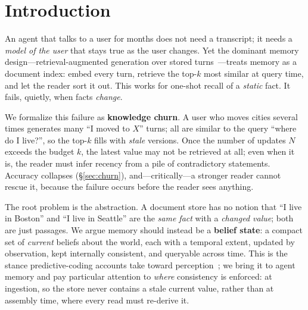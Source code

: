 \documentclass[11pt]{article}
\newcommand{\tenet}{\textsc{Tenet}}
\newcommand{\ci}[2]{{\footnotesize[#1,\,#2]}}
\begin{document}
\begin{abstract}
to HippoRAG-v2 ($65.1$) among published systems while being the only one whose ingestion
never calls an LLM, and beats every published memory framework on EventQA ($70.7$ vs $67.6$; Wilson CI excludes);
on MemoryAgentBench \textsc{Test-Time Learning} it pools $77.2$ \ci{73.3}{80.7}
($n{=}500$), above BM25 ($75.4$) and every published memory system (Zep $62.8$,
Mem0 $32.4$) on a weaker, zero-cost local 7B reader.
Run head-to-head against a released memory framework as a black box (ReMe, its own
ingest-and-retrieve pipeline end-to-end, identical reader and judge), \tenet{} scores
$67.0\%$ vs ReMe's $34.0\%$ on LongMemEval\_S ($n{=}100$, $p\approx2\times10^{-6}$).
All numbers are reproducible from released code with official metrics and prompts verbatim.
\end{abstract}

\section{Introduction}
An agent that talks to a user for months does not need a transcript; it needs a
\emph{model of the user} that stays true as the user changes. Yet the dominant memory
design---retrieval-augmented generation over stored turns~\cite{mem0,longmemeval}---treats
memory as a document index: embed every turn, retrieve the top-$k$ most similar at query
time, and let the reader sort it out. This works for one-shot recall of a \emph{static}
fact. It fails, quietly, when facts \emph{change}.

We formalize this failure as \textbf{knowledge churn}. A user who moves cities several
times generates many ``I moved to $X$'' turns; all are similar to the query ``where do I
live?'', so the top-$k$ fills with \emph{stale} versions. Once the number of updates $N$
exceeds the budget $k$, the latest value may not be retrieved at all; even when it is, the
reader must infer recency from a pile of contradictory statements. Accuracy collapses
(\S\ref{sec:churn}), and---critically---a stronger reader cannot rescue it, because the
failure occurs before the reader sees anything.

The root problem is the abstraction. A document store has no notion that ``I live in
Boston'' and ``I live in Seattle'' are the \emph{same fact} with a \emph{changed value};
both are just passages. We argue memory should instead be a \textbf{belief state}: a
compact set of \emph{current} beliefs about the world, each with a temporal extent,
updated by observation, kept internally consistent, and queryable across time. This is
the stance predictive-coding accounts take toward
perception~\cite{friston}; we bring it to agent memory and pay particular attention to
\emph{where} consistency is enforced: at ingestion, so the store never contains a stale
current value, rather than at assembly time, where every read must re-derive it.
\end{document}
